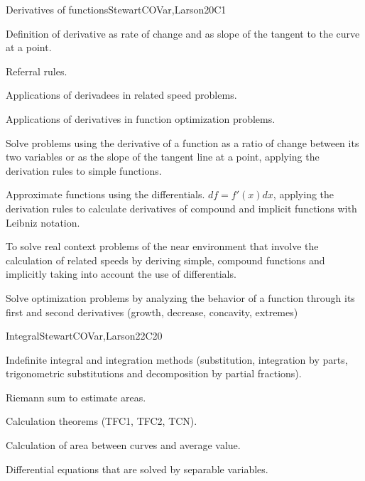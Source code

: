 \begin{syllabus}
\begin{unit}{Derivatives of functions}{}{StewartCOVar,Larson}{20}{C1}
   \begin{topics}
      \item Definition of derivative as rate of change and as slope of the tangent to the curve at a point.
      \item Referral rules.
      \item Applications of derivadees in related speed problems.
      \item Applications of derivatives in function optimization problems.
   \end{topics}

   \begin{learningoutcomes}
      \item Solve problems using the derivative of a function as a ratio of change between its two variables or as the slope of the tangent line at a point, applying the derivation rules to simple functions.
      \item Approximate functions using the differentials. $df=f'(x)dx$, applying the derivation rules to calculate derivatives of compound and implicit functions with Leibniz notation.
      \item To solve real context problems of the near environment that involve the calculation of related speeds by deriving simple, compound functions and implicitly taking into account the use of differentials.
      \item Solve optimization problems by analyzing the behavior of a function through its first and second derivatives (growth, decrease, concavity, extremes)
   \end{learningoutcomes}
\end{unit}

\begin{unit}{Integral}{}{StewartCOVar,Larson}{22}{C20}
   \begin{topics}
      \item Indefinite integral and integration methods (substitution, integration by parts, trigonometric substitutions and decomposition by partial fractions).
      \item Riemann sum to estimate areas.
      \item Calculation theorems (TFC1, TFC2, TCN).
      \item Calculation of area between curves and average value.
      \item Differential equations that are solved by separable variables.
   \end{topics}


\end{unit}
\end{syllabus}
